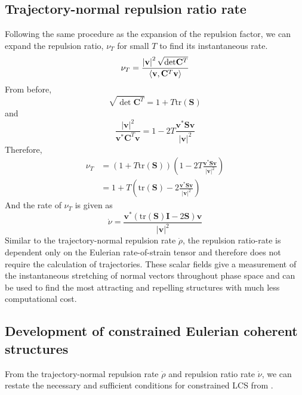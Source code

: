 \documentclass[onecolumn,3p]{elsarticle}
\begin{document}
	\subsection{Trajectory-normal repulsion ratio rate}
	Following the same procedure as the expansion of the repulsion factor, we can expand the repulsion ratio, \(\nu_T\) for small \(T\) to find its instantaneous rate.
	\begin{equation}
		\nu_T  
		= \frac{
			\left| \mathbf{v} \right|^2 \sqrt{{\rm det} \mathbf{C}^T  }}{
			\langle \mathbf{v} ,\mathbf{C}^T   \mathbf{v}  \rangle
		} 
		\label{eq: nuT}
	\end{equation}
	From before,
	\begin{equation}
		\sqrt{\det \mathbf{C}^T } = 1 + T\text{tr}(\mathbf{S} )
	\end{equation}
	and
	\begin{equation}
		\frac{\left|\mathbf{v} \right|^2}{\mathbf{v} ^* \mathbf{C}^T \mathbf{v} } = 1-2T \frac{\mathbf{v}^* \mathbf{S}\mathbf{v}}{\left|\mathbf{v}\right|^2}
	\end{equation}
	Therefore,
	\begin{equation}
		\begin{aligned}
		\nu_T  & = \left(1 + T\text{tr}(\mathbf{S} )\right)\left(1-2T \frac{\mathbf{v} ^* \mathbf{S} \mathbf{v} }{\left|\mathbf{v} \right|^2}\right) \\
		& = 1 + T\left(\text{tr}(\mathbf{S} )-2\frac{\mathbf{v} ^* \mathbf{S} \mathbf{v} }{\left|\mathbf{v} \right|^2}\right)
		\end{aligned}
	\end{equation}
	And the rate of \(\nu_T\) is given as 
	\begin{equation}
		\dot{\nu} = \frac{\mathbf{v}^*\left(\text{tr}(\mathbf{S})\mathbf{I}-2 \mathbf{S}\right)\mathbf{v}}{\left|\mathbf{v}\right|^2}
	\end{equation}
	Similar to the trajectory-normal repulsion rate $\dot{\rho}$, the repulsion ratio-rate is dependent only on the Eulerian rate-of-strain tensor and therefore does not require the calculation of trajectories. These scalar fields give a measurement of the instantaneous stretching of normal vectors throughout phase space and can be used to find the most attracting and repelling structures with much less computational cost.
	
	\subsection{Development of constrained Eulerian coherent structures}
	From the trajectory-normal repulsion rate $\dot{\rho}$ and repulsion ratio rate $\dot{\nu}$, we can restate the necessary and sufficient conditions for constrained LCS from \cite{haller_variational_2011}.
	
\end{document}
